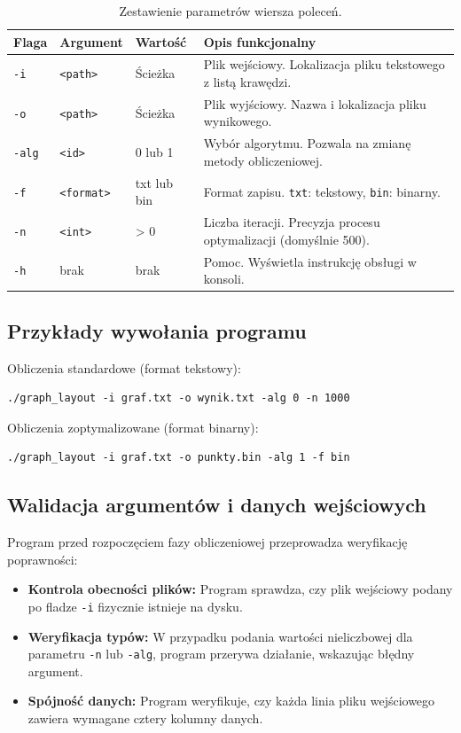 \documentclass[12pt,a4paper]{article}
\begin{document}
\begin{table}[h]
    \centering
    \small
    \begin{tabularx}{\textwidth}{@{} l l l X @{}}
        \toprule
        \textbf{Flaga} & \textbf{Argument} & \textbf{Wartość} & \textbf{Opis funkcjonalny} \\
        \midrule
        \texttt{-i} & \texttt{<path>} & Ścieżka & Plik wejściowy. Lokalizacja pliku tekstowego z listą krawędzi. \\
        \texttt{-o} & \texttt{<path>} & Ścieżka & Plik wyjściowy. Nazwa i lokalizacja pliku wynikowego. \\
        \texttt{-alg} & \texttt{<id>} & 0 lub 1 & Wybór algorytmu. Pozwala na zmianę metody obliczeniowej. \\
        \texttt{-f} & \texttt{<format>} & txt lub bin & Format zapisu. \texttt{txt}: tekstowy, \texttt{bin}: binarny. \\
        \texttt{-n} & \texttt{<int>} & > 0 & Liczba iteracji. Precyzja procesu optymalizacji (domyślnie 500). \\
        \texttt{-h} & brak & brak & Pomoc. Wyświetla instrukcję obsługi w konsoli. \\
        \bottomrule
    \end{tabularx}
    \caption{Zestawienie parametrów wiersza poleceń.}
\end{table}

\subsection{Przykłady wywołania programu}

Obliczenia standardowe (format tekstowy):
\begin{verbatim}
./graph_layout -i graf.txt -o wynik.txt -alg 0 -n 1000
\end{verbatim}

Obliczenia zoptymalizowane (format binarny):
\begin{verbatim}
./graph_layout -i graf.txt -o punkty.bin -alg 1 -f bin
\end{verbatim}

\subsection{Walidacja argumentów i danych wejściowych}

Program przed rozpoczęciem fazy obliczeniowej przeprowadza weryfikację poprawności:

\begin{itemize}[label=\textbullet]
    \item \textbf{Kontrola obecności plików:} Program sprawdza, czy plik wejściowy podany po fladze \texttt{-i} fizycznie istnieje na dysku.
    \item \textbf{Weryfikacja typów:} W przypadku podania wartości nieliczbowej dla parametru \texttt{-n} lub \texttt{-alg}, program przerywa działanie, wskazując błędny argument.
    \item \textbf{Spójność danych:} Program weryfikuje, czy każda linia pliku wejściowego zawiera wymagane cztery kolumny danych.
\end{itemize}
\end{document}
